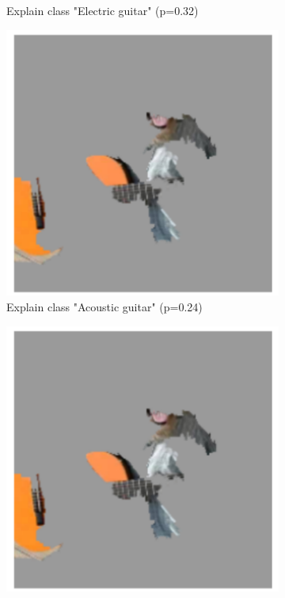 \begin{figure}[H]
\begin{subfigure}[t]{.23\textwidth}
        \caption{Explain class "Electric guitar" (p=0.32)}
    \end{subfigure}\hfill%
    \begin{subfigure}[t]{.23\textwidth}
        \centering
        \includegraphics[width=\linewidth]{chapters/02_methods/images/lime_dog_3.png}
        \caption{Explain class "Acoustic guitar" (p=0.24)}
    \end{subfigure}\hfill%
    \begin{subfigure}[t]{.23\textwidth}
        \centering
        \includegraphics[width=\linewidth]{chapters/02_methods/images/lime_dog_3.png}

\end{subfigure}
\end{figure}
